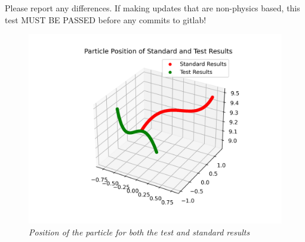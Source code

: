 \documentclass{article}
\begin{document}
\noindent Please report any differences. If making updates that are non-physics based, this test MUST BE PASSED before any commits to gitlab!

\begin{figure}[htbp]
\centering
\includegraphics[width=1.0\textwidth]{Position.png}
\caption{\textit{Position of the particle for both the test and standard results}}
\label{fig:postion}
\end{figure}
\end{document}
